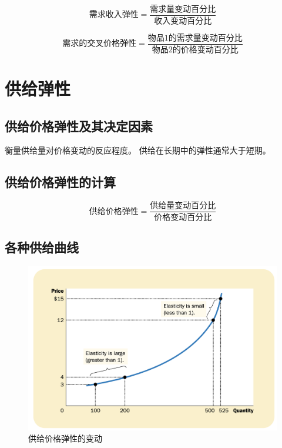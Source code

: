 \begin{equation}
  \text{需求收入弹性} = \frac{\text{需求量变动百分比}}{\text{收入变动百分比}}
\end{equation}

\begin{equation}
  \text{需求的交叉价格弹性} = \frac{\text{物品1的需求量变动百分比}}{\text{物品2的价格变动百分比}}
\end{equation}


\section{供给弹性}

\subsection{供给价格弹性及其决定因素}

衡量供给量对价格变动的反应程度。
供给在长期中的弹性通常大于短期。


\subsection{供给价格弹性的计算}

\begin{equation}
  \text{供给价格弹性} = \frac{\text{供给量变动百分比}}{\text{价格变动百分比}}
\end{equation}


\subsection{各种供给曲线}

\begin{figure}[!ht]
  \centering
  \includegraphics[width=\textwidth]{pics/supply-elastic-price}
  \caption{供给价格弹性的变动}
  \label{fig:supply-elastic-price}
\end{figure}



